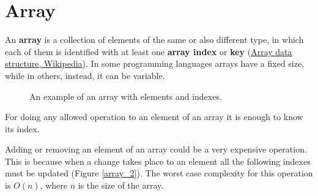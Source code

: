 \section{Array}
An \textbf{array} is a collection of elements of the same or also different type, in which each of them is identified with at least one \textbf{array index} or \textbf{key} \cite{wikiarray} (\href{https://en.wikipedia.org/wiki/Array_data_structure}{Array data structure, Wikipedia}). In some programming languages arrays have a fixed size, while in others, instead, it can be variable.

\begin{figure}[H]
\centering
{}
\caption[An example of an array with elements and indexes.]{An example of an array with elements and indexes.}
\label{array_1}
\end{figure}

For doing any allowed operation to an element of an array it is enough to know its index. 

Adding or removing an element of an array could be a very expensive operation. This is because when a change takes place to an element all the following indexes must be updated (Figure \ref{array_2}). The worst case complexity for this operation is \(O(n)\), where \(n\) is the size of the array.

